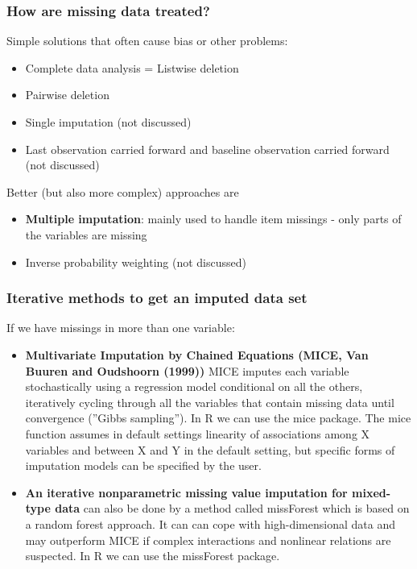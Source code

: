 \documentclass{beamer}\usepackage[]{graphicx}\usepackage[]{color}
\begin{document}
{{{%
\usebackgroundtemplate{}
\begin{frame}
\frametitle{How are missing data treated?}
Simple solutions that often cause bias or other problems:
\begin{itemize}
\item Complete data analysis = Listwise deletion
\item Pairwise deletion
\item Single imputation (not discussed)
\item Last observation carried forward and baseline observation carried
forward (not discussed)
\end{itemize}
Better (but also more complex) approaches are
\begin{itemize}
\item \textbf{Multiple imputation}: mainly used to handle item missings - only
parts of the variables are missing
\item Inverse probability weighting (not discussed)
\end{itemize}
\end{frame}

\usebackgroundtemplate{}
\begin{frame}
\frametitle{Iterative methods to get an imputed data set}
\small
If we have missings in more than one variable:
\begin{itemize}
\item \textbf{Multivariate Imputation by Chained Equations (MICE, Van Buuren
and Oudshoorn (1999))} \newline
MICE imputes each variable stochastically using a regression model
conditional on all the others, iteratively cycling through all the variables that
contain missing data until convergence (''Gibbs sampling'').
In R we can use the mice package. The mice function assumes in default
settings linearity of associations among X variables and between X and Y in
the default setting, but specific forms of imputation models can be specified by
the user.
\item \textbf{An iterative nonparametric missing value imputation for mixed-type data}
can also be done by a method called missForest which is based on a random
forest approach. It can can cope with high-dimensional data and may
outperform MICE if complex interactions and nonlinear relations are
suspected. In R we can use the missForest package.
\end{itemize}
\end{frame}

}}}
\end{document}
